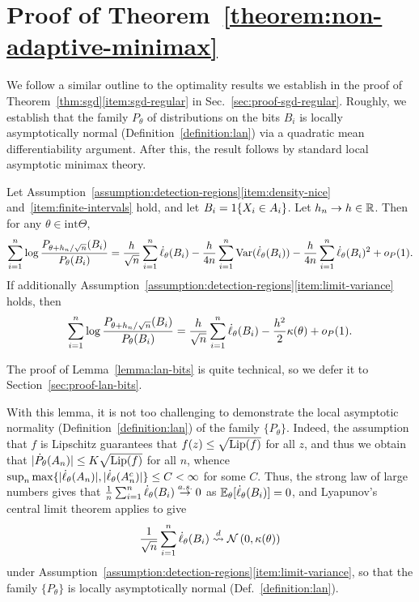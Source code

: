 
\section{Proof of Theorem~\ref{theorem:non-adaptive-minimax}}

We follow a similar outline to the optimality results we establish
in the proof of Theorem~\ref{thm:sgd}\eqref{item:sgd-regular} in
Sec.~\ref{sec:proof-sgd-regular}.
Roughly, we establish that the family $P_\theta$ of distributions
on the bits $B_i$ is locally asymptotically normal
(Definition~\ref{definition:lan}) via a quadratic
mean differentiability argument. After this, the result
follows by standard local asymptotic minimax theory.

\begin{lemma}
  \label{lemma:lan-bits}
  Let Assumption~\ref{assumption:detection-regions}\eqref{item:density-nice}
  and~\eqref{item:finite-intervals} hold, and let
  $B_i = 1\!\left\{X_i \in A_i\right\}$.
  Let $h_n \to h \in \mathbb{R}$. Then for any $\theta \in \mbox{int}\Theta$,
  \begin{equation*}
    \sum_{i = 1}^n \log \frac{P_{\theta + h_n/\sqrt{n}}(B_i)}{
      P_\theta(B_i)}
    = \frac{h}{\sqrt{n}}
    \sum_{i = 1}^n \dot{\ell}_\theta(B_i)
    - \frac{h}{4n} \sum_{i = 1}^n \textup{Var}(\dot{\ell}_\theta(B_i))
    - \frac{h}{4n} \sum_{i = 1}^n \dot{\ell}_\theta(B_i)^2
    + o_P(1).
  \end{equation*}
  If additionally
  Assumption~\ref{assumption:detection-regions}\eqref{item:limit-variance}
  holds, then
  \begin{equation*}
    \sum_{i = 1}^n \log \frac{P_{\theta + h_n/\sqrt{n}}(B_i)}{
      P_\theta(B_i)}
    = \frac{h}{\sqrt{n}}
    \sum_{i = 1}^n \dot{\ell}_\theta(B_i)
    - \frac{h^2}{2} \kappa(\theta) + o_P(1).
  \end{equation*}
\end{lemma}
\noindent
The proof of Lemma~\ref{lemma:lan-bits} is quite technical,
so we defer it to Section~\ref{sec:proof-lan-bits}.

With this lemma, it is not too challenging to demonstrate the local
asymptotic normality (Definition~\ref{definition:lan}) of the family
$\{P_\theta\}$. Indeed, the assumption that $f$ is Lipschitz guarantees that
$f(z) \le \sqrt{{\rm \textup{Lip}}(f)}$ for all $z$, and thus we obtain that
$|\dot{P}_\theta(A_n)| \le K \sqrt{{\rm \textup{Lip}}(f)}$ for all $n$, whence $\sup_n
\max\{|\dot{\ell}_\theta(A_n)|, |\dot{\ell}_\theta(A_n^c)|\} \le C < \infty$ for
some $C$. Thus, the strong law of large numbers
gives that
$\frac{1}{n} \sum_{i = 1}^n \dot{\ell}_\theta(B_i)
\stackrel{a.s.}{\rightarrow} 0$ as $\mathbb{E}_\theta[\dot{\ell}_\theta(B_i)] = 0$, and Lyapunov's central
limit theorem applies to give
\begin{equation*}
  \frac{1}{\sqrt{n}} \sum_{i = 1}^n \dot{\ell}_\theta(B_i)
  \stackrel{d}{\rightsquigarrow} \mathcal{N}\left(0, \kappa(\theta)\right)
\end{equation*}
under
Assumption~\ref{assumption:detection-regions}\eqref{item:limit-variance},
so that the family $\{P_\theta\}$ is locally asymptotically normal
(Def.~\ref{definition:lan}).

